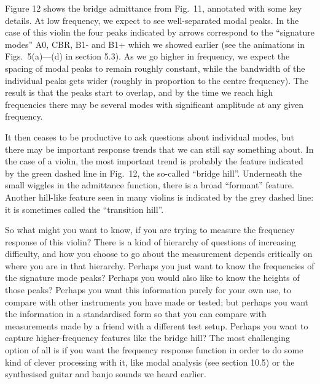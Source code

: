   Figure 12 shows the bridge admittance from Fig.\ 11, annotated with some key 
  details. At low frequency, we expect to see well-separated modal peaks. In 
  the case of this violin the four peaks indicated by arrows correspond to the 
  “signature modes” A0, CBR, B1- and B1+ which we showed earlier (see the 
  animations in Figs.\ 5(a)—(d) in section 5.3). As we go higher in frequency, 
  we expect the spacing of modal peaks to remain roughly constant, while the 
  bandwidth of the individual peaks gets wider (roughly in proportion to the 
  centre frequency). The result is that the peaks start to overlap, and by the 
  time we reach high frequencies there may be several modes with significant 
  amplitude at any given frequency. 


  It then ceases to be productive to ask questions about individual modes, but 
  there may be important response trends that we can still say something about. 
  In the case of a violin, the most important trend is probably the feature 
  indicated by the green dashed line in Fig.\ 12, the so-called “bridge hill”. 
  Underneath the small wiggles in the admittance function, there is a broad 
  “formant” feature. Another hill-like feature seen in many violins is 
  indicated by the grey dashed line: it is sometimes called the “transition 
  hill”. 

  So what might you want to know, if you are trying to measure the frequency 
  response of this violin? There is a kind of hierarchy of questions of 
  increasing difficulty, and how you choose to go about the measurement depends 
  critically on where you are in that hierarchy. Perhaps you just want to know 
  the frequencies of the signature mode peaks? Perhaps you would also like to 
  know the heights of those peaks? Perhaps you want this information purely for 
  your own use, to compare with other instruments you have made or tested; but 
  perhaps you want the information in a standardised form so that you can 
  compare with measurements made by a friend with a different test setup. 
  Perhaps you want to capture higher-frequency features like the bridge hill? 
  The most challenging option of all is if you want the frequency response 
  function in order to do some kind of clever processing with it, like modal 
  analysis (see section 10.5) or the synthesised guitar and banjo sounds we 
  heard earlier. 

